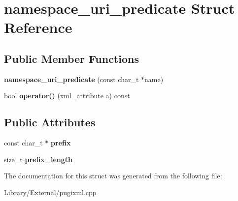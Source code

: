\hypertarget{structnamespace__uri__predicate}{}\section{namespace\+\_\+uri\+\_\+predicate Struct Reference}
\label{structnamespace__uri__predicate}
\subsection*{Public Member Functions}
\begin{DoxyCompactItemize}
\item 
\hypertarget{structnamespace__uri__predicate_a25bef9c1e12b0fdc908275ae7ab7c202}{}{\bfseries namespace\+\_\+uri\+\_\+predicate} (const char\+\_\+t $\ast$name)\label{structnamespace__uri__predicate_a25bef9c1e12b0fdc908275ae7ab7c202}

\item 
\hypertarget{structnamespace__uri__predicate_a9b1508940726f332b8a6c61a1d800ade}{}bool {\bfseries operator()} (xml\+\_\+attribute a) const \label{structnamespace__uri__predicate_a9b1508940726f332b8a6c61a1d800ade}

\end{DoxyCompactItemize}
\subsection*{Public Attributes}
\begin{DoxyCompactItemize}
\item 
\hypertarget{structnamespace__uri__predicate_a80a2c051b9e57b8895c28d8fcc32e051}{}const char\+\_\+t $\ast$ {\bfseries prefix}\label{structnamespace__uri__predicate_a80a2c051b9e57b8895c28d8fcc32e051}

\item 
\hypertarget{structnamespace__uri__predicate_aa48279192e8d48b9c798f5485a2a9170}{}size\+\_\+t {\bfseries prefix\+\_\+length}\label{structnamespace__uri__predicate_aa48279192e8d48b9c798f5485a2a9170}

\end{DoxyCompactItemize}


The documentation for this struct was generated from the following file\+:\begin{DoxyCompactItemize}
\item 
Library/\+External/pugixml.\+cpp\end{DoxyCompactItemize}
